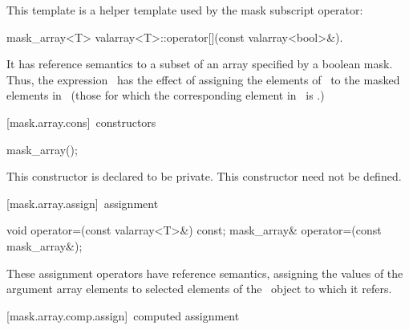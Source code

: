 \documentclass[american,twoside]{book}
\begin{document}
\begin{paras}
\pnum
This template is a helper template used by the mask subscript operator:

\begin{itemdecl}
mask_array<T> valarray<T>::operator[](const valarray<bool>&).
\end{itemdecl}

\begin{itemdescr}
\pnum
It has reference semantics to a subset of an array specified by a boolean mask.
Thus, the expression
\
has the effect of assigning the elements of
\
to the masked
elements in
\
(those for which the corresponding element
in
\
is
.)
\end{itemdescr}

[mask.array.cons]{\ constructors}

%
\begin{itemdecl}
mask_array();
\end{itemdecl}

\begin{itemdescr}
\pnum
This constructor is declared to be private.
This constructor need not be defined.
\end{itemdescr}

\rSec3[mask.array.assign]{\tcode{mask_array}\ assignment}

%
\begin{itemdecl}
void operator=(const valarray<T>&) const;
mask_array& operator=(const mask_array&);
\end{itemdecl}

\begin{itemdescr}
\pnum
These assignment operators have reference semantics, assigning the values
of the argument array elements to selected elements of the
\
object to which it refers.
\end{itemdescr}

\rSec3[mask.array.comp.assign]{\tcode{mask_array}\ computed assignment}


\end{paras}
\end{document}
